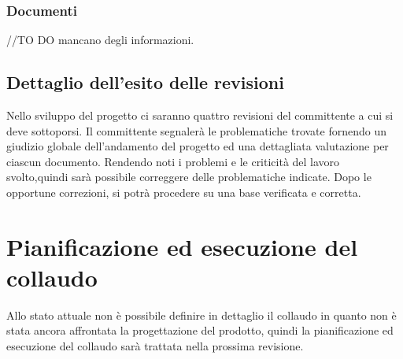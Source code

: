 \documentclass[12pt,a4paper]{article}
\begin{document}
\subsubsection{Documenti}
//TO DO \IB mancano degli informazioni.
\subsection{Dettaglio dell'esito delle revisioni}
Nello sviluppo del progetto ci saranno quattro revisioni del committente a cui si deve sottoporsi. Il committente segnalerà le problematiche trovate fornendo un giudizio globale dell'andamento del progetto ed una dettagliata valutazione per ciascun documento. Rendendo noti i problemi e le criticità del lavoro svolto,quindi sarà possibile correggere delle problematiche indicate. Dopo le opportune correzioni, si potrà procedere su una base verificata e corretta.
\newpage
\section{Pianificazione ed esecuzione del collaudo}
Allo stato attuale non è possibile definire in dettaglio il collaudo in quanto non è stata ancora affrontata la
progettazione del prodotto, quindi la pianificazione ed esecuzione del collaudo sarà trattata nella prossima revisione.
\end{document}

